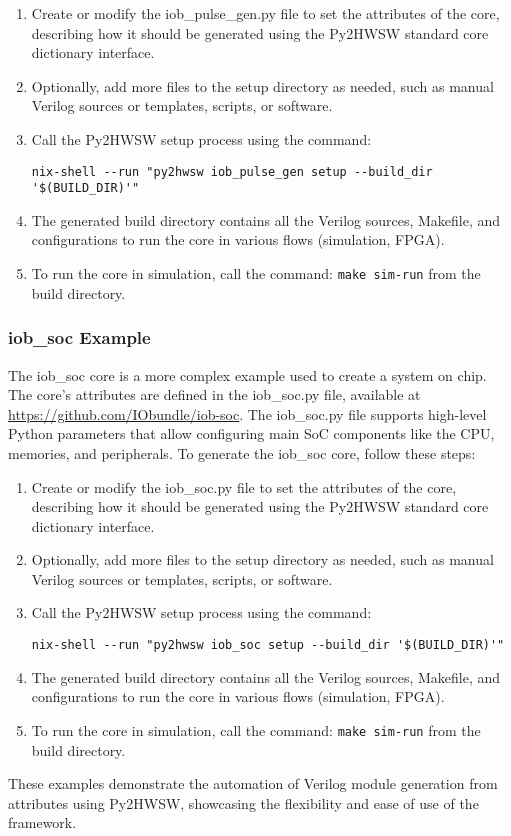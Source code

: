 \begin{enumerate}
\item Create or modify the iob\_pulse\_gen.py file to set the attributes of the core, describing how it should be generated using the Py2HWSW standard core dictionary interface.
\item Optionally, add more files to the setup directory as needed, such as manual Verilog sources or templates, scripts, or software.
\item Call the Py2HWSW setup process using the command:
\begin{verbatim}
nix-shell --run "py2hwsw iob_pulse_gen setup --build_dir '$(BUILD_DIR)'"
\end{verbatim}
\item The generated build directory contains all the Verilog sources, Makefile, and configurations to run the core in various flows (simulation, FPGA).
\item To run the core in simulation, call the command: \texttt{make sim-run} from the build directory.
\end{enumerate}

\subsubsection{iob\_soc Example}

The iob\_soc core is a more complex example used to create a system on chip. The core's attributes are defined in the iob\_soc.py file, available at \url{https://github.com/IObundle/iob-soc}. The iob\_soc.py file supports high-level Python parameters that allow configuring main SoC components like the CPU, memories, and peripherals. To generate the iob\_soc core, follow these steps:

\begin{enumerate}
\item Create or modify the iob\_soc.py file to set the attributes of the core, describing how it should be generated using the Py2HWSW standard core dictionary interface.
\item Optionally, add more files to the setup directory as needed, such as manual Verilog sources or templates, scripts, or software.
\item Call the Py2HWSW setup process using the command:
\begin{verbatim}
nix-shell --run "py2hwsw iob_soc setup --build_dir '$(BUILD_DIR)'"
\end{verbatim}
\item The generated build directory contains all the Verilog sources, Makefile, and configurations to run the core in various flows (simulation, FPGA).
\item To run the core in simulation, call the command: \texttt{make sim-run} from the build directory.
\end{enumerate}

These examples demonstrate the automation of Verilog module generation from attributes using Py2HWSW, showcasing the flexibility and ease of use of the framework.
